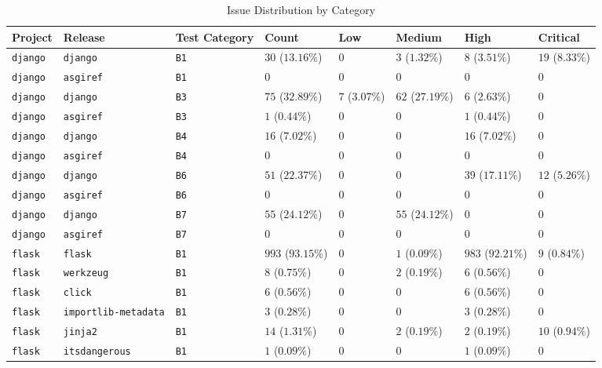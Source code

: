 \begin{table}
\caption{Issue Distribution by Category}
\label{tab:issue-category-distribution}
\begin{tabular}{llllllll}
\toprule
Project & Release & Test Category & Count & Low & Medium & High & Critical \\
\midrule
\texttt{django} & \texttt{django} & \texttt{B1} & $30$ ($13.16\%$) & $0$ & $3$ ($1.32\%$) & $8$ ($3.51\%$) & $19$ ($8.33\%$) \\
\texttt{django} & \texttt{asgiref} & \texttt{B1} & $0$ & $0$ & $0$ & $0$ & $0$ \\
\texttt{django} & \texttt{django} & \texttt{B3} & $75$ ($32.89\%$) & $7$ ($3.07\%$) & $62$ ($27.19\%$) & $6$ ($2.63\%$) & $0$ \\
\texttt{django} & \texttt{asgiref} & \texttt{B3} & $1$ ($0.44\%$) & $0$ & $0$ & $1$ ($0.44\%$) & $0$ \\
\texttt{django} & \texttt{django} & \texttt{B4} & $16$ ($7.02\%$) & $0$ & $0$ & $16$ ($7.02\%$) & $0$ \\
\texttt{django} & \texttt{asgiref} & \texttt{B4} & $0$ & $0$ & $0$ & $0$ & $0$ \\
\texttt{django} & \texttt{django} & \texttt{B6} & $51$ ($22.37\%$) & $0$ & $0$ & $39$ ($17.11\%$) & $12$ ($5.26\%$) \\
\texttt{django} & \texttt{asgiref} & \texttt{B6} & $0$ & $0$ & $0$ & $0$ & $0$ \\
\texttt{django} & \texttt{django} & \texttt{B7} & $55$ ($24.12\%$) & $0$ & $55$ ($24.12\%$) & $0$ & $0$ \\
\texttt{django} & \texttt{asgiref} & \texttt{B7} & $0$ & $0$ & $0$ & $0$ & $0$ \\
\texttt{flask} & \texttt{flask} & \texttt{B1} & $993$ ($93.15\%$) & $0$ & $1$ ($0.09\%$) & $983$ ($92.21\%$) & $9$ ($0.84\%$) \\
\texttt{flask} & \texttt{werkzeug} & \texttt{B1} & $8$ ($0.75\%$) & $0$ & $2$ ($0.19\%$) & $6$ ($0.56\%$) & $0$ \\
\texttt{flask} & \texttt{click} & \texttt{B1} & $6$ ($0.56\%$) & $0$ & $0$ & $6$ ($0.56\%$) & $0$ \\
\texttt{flask} & \texttt{importlib-metadata} & \texttt{B1} & $3$ ($0.28\%$) & $0$ & $0$ & $3$ ($0.28\%$) & $0$ \\
\texttt{flask} & \texttt{jinja2} & \texttt{B1} & $14$ ($1.31\%$) & $0$ & $2$ ($0.19\%$) & $2$ ($0.19\%$) & $10$ ($0.94\%$) \\
\texttt{flask} & \texttt{itsdangerous} & \texttt{B1} & $1$ ($0.09\%$) & $0$ & $0$ & $1$ ($0.09\%$) & $0$ \\

\end{tabular}
\end{table}
